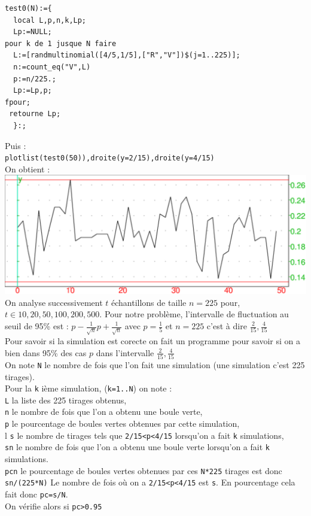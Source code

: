 \documentclass[a4paper,11pt]{book}
\begin{document}
\begin{verbatim}
test0(N):={
  local L,p,n,k,Lp;
  Lp:=NULL;
pour k de 1 jusque N faire
  L:=[randmultinomial([4/5,1/5],["R","V"])$(j=1..225)];
  n:=count_eq("V",L)
  p:=n/225.;
  Lp:=Lp,p;
fpour;
 retourne Lp;
  }:;
\end{verbatim}
Puis :\\
{\tt plotlist(test0(50)),droite(y=2/15),droite(y=4/15)}\\
On obtient :\\
\includegraphics[width=\textwidth]{stattest}
 On analyse successivement $t$ échantillons de taille $n=225$ pour, 
$t\in {10, 20, 50, 100, 200, 500}$.
Pour notre problème, l’intervalle de fluctuation au seuil de 95\% est :
$p-\frac{1}{\sqrt n} p+\frac{1}{\sqrt n}$ avec $p=\frac{1}{5}$ et $n=225$ 
c'est \`a dire $\frac{2}{15},\frac{4}{15}$\\
Pour savoir si la simulation est corecte on fait un programme pour savoir si
on a bien dans 95\% des cas $p$ dans l'intervalle $\frac{2}{15},\frac{4}{15}$\\
On note {\tt N} le nombre de fois que l'on fait une simulation (une simulation
c'est 225 tirages).\\
Pour la {\tt k} i\`eme simulation, ({\tt k=1..N}) on note :\\
{\tt L} la liste des 225 tirages obtenus,\\
{\tt n} le nombre de fois que l'on a obtenu une boule verte,\\
{\tt p} le  pourcentage de boules vertes obtenues par cette simulation,\\l
{\tt s} le nombre de tirages tels que {\tt 2/15<p<4/15} lorsqu'on a fait 
{\tt k} simulations,\\
{\tt sn} le nombre de fois que l'on a obtenu une boule verte lorsqu'on a fait 
{\tt k} simulations.\\
{\tt pcn} le pourcentage de boules vertes obtenues  par ces {\tt N*225}
tirages est donc {\tt sn/(225*N)} 
Le nombre de fois o\`u on a {\tt 2/15<p<4/15} est {\tt s}. En pourcentage 
cela fait donc {\tt pc=s/N}.\\
On v\'erifie alors si {\tt pc>0.95}
\end{document}
